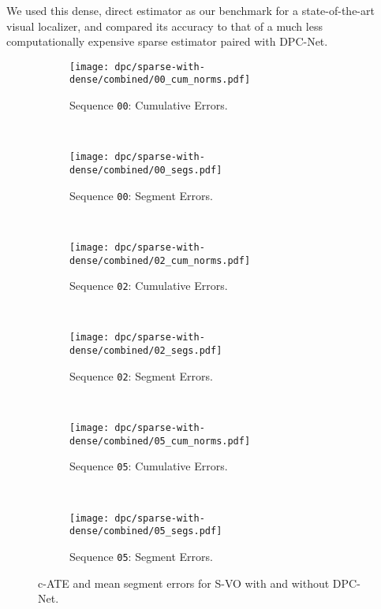 We used this dense, direct estimator as our benchmark for a state-of-the-art visual localizer, and compared its accuracy to that of a much less computationally expensive sparse estimator paired with DPC-Net.

\begin{figure}
    \centering
    \begin{subfigure}{0.48\textwidth}
	   \texttt{[image: dpc/sparse-with-dense/combined/00\_cum\_norms.pdf]}
       \label{00-pose-cum}
       \caption{Sequence \texttt{00}: Cumulative Errors.}
    \end{subfigure}
    ~
    \begin{subfigure}{0.48\textwidth}
        \texttt{[image: dpc/sparse-with-dense/combined/00\_segs.pdf]}
        \label{00-pose-segs}
        \caption{Sequence \texttt{00}: Segment Errors.}
     \end{subfigure}
     ~
     \begin{subfigure}{0.48\textwidth}
        \texttt{[image: dpc/sparse-with-dense/combined/02\_cum\_norms.pdf]}
        \label{02-pose-cum}
        \caption{Sequence \texttt{02}: Cumulative Errors.}
     \end{subfigure}
     ~
     \begin{subfigure}{0.48\textwidth}
         \texttt{[image: dpc/sparse-with-dense/combined/02\_segs.pdf]}
         \label{02-pose-segs}
         \caption{Sequence \texttt{02}: Segment Errors.}
      \end{subfigure}
      ~
      \begin{subfigure}{0.48\textwidth}
        \texttt{[image: dpc/sparse-with-dense/combined/05\_cum\_norms.pdf]}
        \label{05-pose-cum}
        \caption{Sequence \texttt{05}: Cumulative Errors.}
     \end{subfigure}
     ~
     \begin{subfigure}{0.48\textwidth}
         \texttt{[image: dpc/sparse-with-dense/combined/05\_segs.pdf]}
         \label{05-pose-segs}
         \caption{Sequence \texttt{05}: Segment Errors.}
      \end{subfigure}
   \caption{c-ATE and mean segment errors for S-VO with and without DPC-Net.}
  \label{fig:cum-seg-errs} 
\end{figure}


